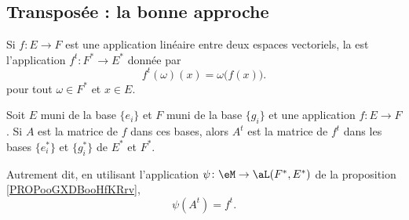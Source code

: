 \subsection{Transposée : la bonne approche}

\begin{definition}      \label{DefooZLPAooKTITdd}
    Si \( f\colon E\to F\) est une application linéaire entre deux espaces vectoriels, la  est l'application \( f^t\colon F^*\to E^*\) donnée par
    \begin{equation}
        f^t(\omega)(x)=\omega\big( f(x) \big).
    \end{equation}
    pour tout \( \omega\in F^*\) et \( x\in E\).
\end{definition}

\begin{lemma}       \label{LEMooEMNNooPquZMg}
    Soit \( E\) muni de la base \( \{ e_i \}\) et \( F\) muni de la base \( \{ g_i \}\) et une application \( f\colon E\to F\). Si \( A\) est la matrice de \( f\) dans ces bases, alors \( A^t\) est la matrice de \( f^t\) dans les bases \( \{ e^*_i \}\) et \( \{ g^*_i \}\) de \( E^*\) et \( F^*\).

    Autrement dit, en utilisant l'application \( \psi\colon \eM\to \aL(F^*,E^*)\) de la proposition \ref{PROPooGXDBooHfKRrv},
    \begin{equation}
        \psi(A^t)=f^t.
    \end{equation}
\end{lemma}

